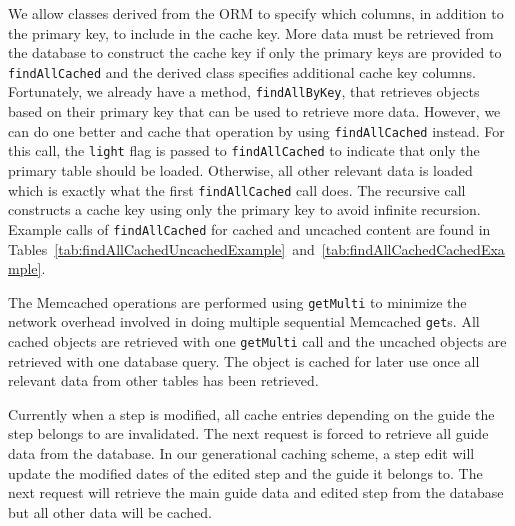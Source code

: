 \documentclass[12pt]{ucthesis}
\begin{document}
We allow classes derived from the ORM to specify which columns, in addition to the primary key, to include in the cache key.
More data must be retrieved from the database to construct the cache key if only the primary keys are provided to {\tt findAllCached} and the derived class specifies additional cache key columns.
Fortunately, we already have a method, {\tt findAllByKey}, that retrieves objects based on their primary key that can be used to retrieve more data.
However, we can do one better and cache that operation by using {\tt findAllCached} instead.
For this call, the {\tt light} flag is passed to {\tt findAllCached} to indicate that only the primary table should be loaded.
Otherwise, all other relevant data is loaded which is exactly what the first {\tt findAllCached} call does.
The recursive call constructs a cache key using only the primary key to avoid infinite recursion.
Example calls of {\tt findAllCached} for cached and uncached content are found in Tables~\ref{tab:findAllCachedUncachedExample}~and~\ref{tab:findAllCachedCachedExample}.

The \textsf{Memcached} operations are performed using {\tt getMulti} to minimize the network overhead involved in doing multiple sequential \textsf{Memcached} {\tt get}s.
All cached objects are retrieved with one {\tt getMulti} call and the uncached objects are retrieved with one database query.
The object is cached for later use once all relevant data from other tables has been retrieved.

Currently when a step is modified, all cache entries depending on the guide the step belongs to are invalidated.
The next request is forced to retrieve all guide data from the database.
In our generational caching scheme, a step edit will update the modified dates of the edited step and the guide it belongs to.
The next request will retrieve the main guide data and edited step from the database but all other data will be cached.
\end{document}
